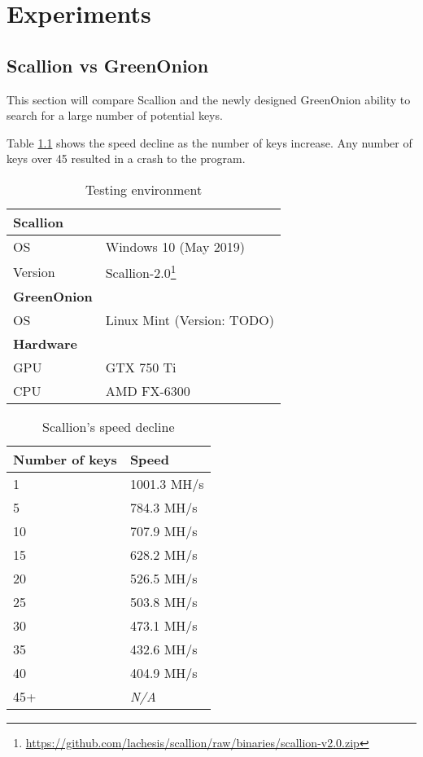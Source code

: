 \chapter{Experiments}
\label{cha:Experiments}

\section{Scallion vs GreenOnion}
\label{sec:SvG}
This section will compare Scallion and the newly designed GreenOnion ability to search for a large number of potential keys.

Table \ref{tab:scallion_speed} shows the speed decline as the number of keys increase. Any number of keys over 45 resulted in a crash to the program.


\begin{table}[!h]
    \centering
    \begin{tabular}{|ll|}
        \hline
        \textbf{Scallion} & \\
        \hline
        OS & Windows 10 (May 2019) \\
        Version & Scallion-2.0\footnote{\url{https://github.com/lachesis/scallion/raw/binaries/scallion-v2.0.zip}} \\
        \hline
        \textbf{GreenOnion} & \\
        \hline
        OS & Linux Mint (Version: TODO) \\ 
        \hline
        \textbf{Hardware} & \\
        \hline
        GPU & GTX 750 Ti  \\
        CPU & AMD FX-6300 \\
        \hline
    \end{tabular}
    \caption{Testing environment}
\end{table}

\begin{table}[!h]
    \centering
    \begin{tabular}{|ll|}
        \hline
        \textbf{Number of keys} & \textbf{Speed} \\
        \hline
        1 & 1001.3 MH/s \\
        5 & 784.3 MH/s \\
        10 & 707.9 MH/s \\
        15 & 628.2 MH/s \\
        20 & 526.5 MH/s \\
        25 & 503.8 MH/s \\
        30 & 473.1 MH/s \\
        35 & 432.6 MH/s \\
        40 & 404.9 MH/s \\
        45+ & \textit{N/A} \\
        \hline
    \end{tabular}
    \caption{Scallion's speed decline}
    \label{tab:scallion_speed}
\end{table}

